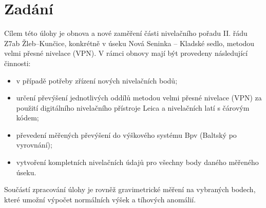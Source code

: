\section{Zadání}

Cílem této úlohy je obnova a nové zaměření části nivelačního pořadu II. řádu Z7ab Žleb–Kunčice, konkrétně v úseku Nová Seninka – Kladské sedlo, metodou velmi přesné nivelace (VPN). V rámci obnovy mají být provedeny následující činnosti:
\begin{itemize}
    \item v případě potřeby zřízení nových nivelačních bodů;
    \item určení převýšení jednotlivých oddílů metodou velmi přesné nivelace (VPN) za použití digitálního nivelačního přístroje Leica a nivelačních latí s čárovým kódem;
    \item převedení měřených převýšení do výškového systému Bpv (Baltský po vyrovnání);
    \item vytvoření kompletních nivelačních údajů pro všechny body daného měřeného úseku.
\end{itemize}
Součástí zpracování úlohy je rovněž gravimetrické měření na vybraných bodech, které umožní výpočet normálních výšek a tíhových anomálií.